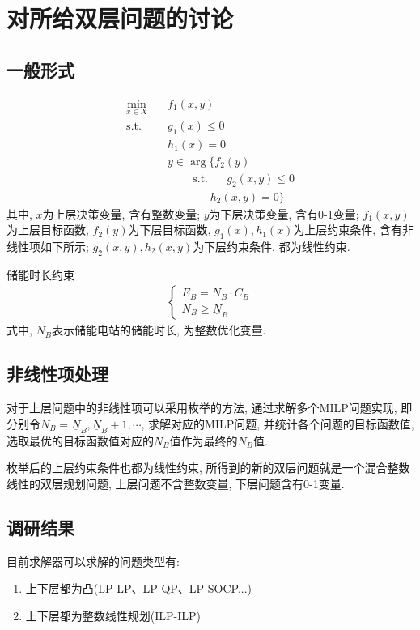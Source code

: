 \documentclass{article}
\begin{document}
\section{对所给双层问题的讨论}
\subsection{一般形式}
\begin{align}
    \min_{x\in X}\quad & f_1(x,y)  \\
    \mathrm{s.t.}\quad &g_1(x)\leq0  \\
    &h_1(x)=0\\
    &y\in\mathop{\arg\max_{y\in Y}}\{f_2(y) \\
    &\qquad~\mathrm{s.t.}~~~\quad g_2(x,y)\leq0\\
    &~~~~~~~~~~~~~~~~~h_2(x,y)=0\}
\end{align}
其中, $x$为上层决策变量, 含有整数变量; $y$为下层决策变量, 含有0-1变量; $f_1(x,y)$为上层目标函数, $f_2(y)$为下层目标函数, $g_1(x),h_1(x)$为上层约束条件, 含有非线性项如下所示; $g_2(x,y),h_2(x,y)$为下层约束条件, 都为线性约束.

储能时长约束
\begin{align*}
    \begin{cases}E_B=N_B\cdot C_B\\N_B\geq\underline{N}_B\end{cases}
\end{align*}
式中, $N_B$表示储能电站的储能时长, 为整数优化变量.

\subsection{非线性项处理}
对于上层问题中的非线性项可以采用枚举的方法, 通过求解多个MILP问题实现, 即分别令$N_B=\underline{N}_B,\underline{N}_B+1,\cdots$, 求解对应的MILP问题, 并统计各个问题的目标函数值, 选取最优的目标函数值对应的$N_B$值作为最终的$N_B$值.

枚举后的上层约束条件也都为线性约束, 所得到的新的双层问题就是一个混合整数线性的双层规划问题, 上层问题不含整数变量, 下层问题含有0-1变量.

\subsection{调研结果}
目前求解器可以求解的问题类型有:
\begin{enumerate}
    \item {上下层都为凸(LP-LP、LP-QP、LP-SOCP...)}
    \item {上下层都为整数线性规划(ILP-ILP)}
\end{enumerate}
\end{document}
